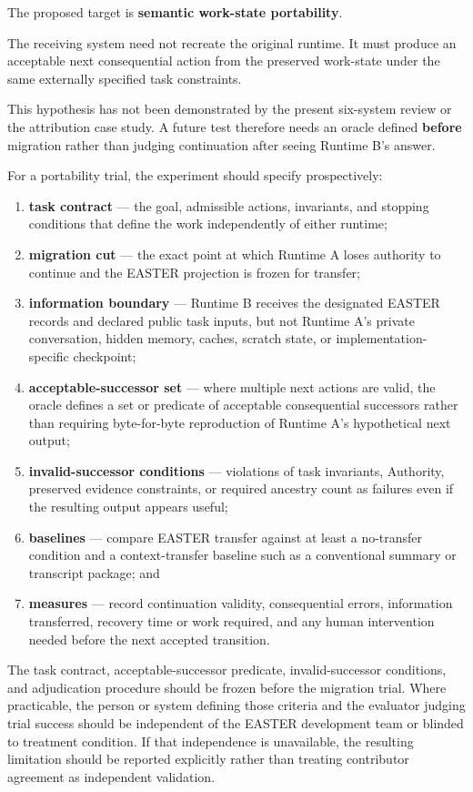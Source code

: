 \documentclass[11pt]{article}
\begin{document}
The proposed target is \textbf{semantic work-state portability}.

The receiving system need not recreate the original runtime. It must produce an acceptable next consequential action from the preserved work-state under the same externally specified task constraints.

This hypothesis has not been demonstrated by the present six-system review or the attribution case study. A future test therefore needs an oracle defined \textbf{before} migration rather than judging continuation after seeing Runtime B's answer.

For a portability trial, the experiment should specify prospectively:

\begin{enumerate}
\item \textbf{task contract} --- the goal, admissible actions, invariants, and stopping conditions that define the work independently of either runtime;
\item \textbf{migration cut} --- the exact point at which Runtime A loses authority to continue and the EASTER projection is frozen for transfer;
\item \textbf{information boundary} --- Runtime B receives the designated EASTER records and declared public task inputs, but not Runtime A's private conversation, hidden memory, caches, scratch state, or implementation-specific checkpoint;
\item \textbf{acceptable-successor set} --- where multiple next actions are valid, the oracle defines a set or predicate of acceptable consequential successors rather than requiring byte-for-byte reproduction of Runtime A's hypothetical next output;
\item \textbf{invalid-successor conditions} --- violations of task invariants, Authority, preserved evidence constraints, or required ancestry count as failures even if the resulting output appears useful;
\item \textbf{baselines} --- compare EASTER transfer against at least a no-transfer condition and a context-transfer baseline such as a conventional summary or transcript package; and
\item \textbf{measures} --- record continuation validity, consequential errors, information transferred, recovery time or work required, and any human intervention needed before the next accepted transition.
\end{enumerate}

The task contract, acceptable-successor predicate, invalid-successor conditions, and adjudication procedure should be frozen before the migration trial. Where practicable, the person or system defining those criteria and the evaluator judging trial success should be independent of the EASTER development team or blinded to treatment condition. If that independence is unavailable, the resulting limitation should be reported explicitly rather than treating contributor agreement as independent validation.
\end{document}
